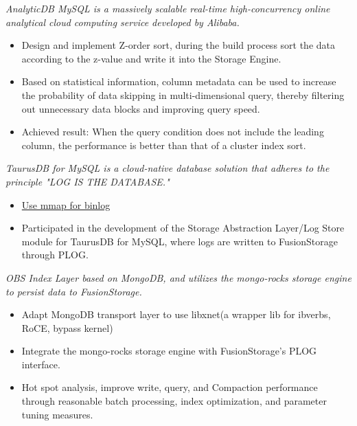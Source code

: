 \documentclass{resume}
\begin{document}
\textit{AnalyticDB MySQL is a massively scalable real-time high-concurrency online analytical cloud computing service developed by Alibaba.}
\begin{onehalfspacing}
\begin{itemize}
  \item Design and implement Z-order sort, during the build process sort the data according to the z-value and write it into the Storage Engine.
  \item Based on statistical information, column metadata can be used to increase the probability of data skipping in multi-dimensional query, thereby filtering out unnecessary data blocks and improving query speed.
  \item Achieved result: When the query condition does not include the leading column, the performance is better than that of a cluster index sort.
\end{itemize}
\end{onehalfspacing}

\textit{TaurusDB for MySQL is a cloud-native database solution that adheres to the principle "LOG IS THE DATABASE."}
\begin{onehalfspacing}
\begin{itemize}
  \item \href{https://github.com/mysql/mysql-server/pull/314}{Use mmap for binlog}
  \item Participated in the development of the Storage Abstraction Layer/Log Store module for TaurusDB for MySQL, where logs are written to FusionStorage through PLOG.
\end{itemize}
\end{onehalfspacing}

\textit{OBS Index Layer based on MongoDB, and utilizes the mongo-rocks storage engine to persist data to FusionStorage.}
\begin{onehalfspacing}
\begin{itemize}
  \item Adapt MongoDB transport layer to use libxnet(a wrapper lib for ibverbs, RoCE, bypass kernel)
  \item Integrate the mongo-rocks storage engine with FusionStorage's PLOG interface.
  \item Hot spot analysis, improve write, query, and Compaction performance through reasonable batch processing, index optimization, and parameter tuning measures.
\end{itemize}
\end{onehalfspacing}
\end{document}
